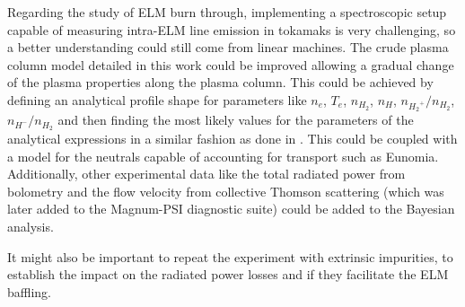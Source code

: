 Regarding the study of ELM burn through, implementing a spectroscopic setup capable of measuring intra-ELM line emission in tokamaks is very challenging, so a better understanding could still come from linear machines. The crude plasma column model detailed in this work could be improved allowing a gradual change of the plasma properties along the plasma column. This could be achieved by defining an analytical profile shape for parameters like $n_e$, $T_e$, $n_{H_2}$, $n_{H}$, $n_{{H_2}^+}/n_{H_2}$, $n_{{H}^-}/n_{H_2}$ and then finding the most likely values for the parameters of the analytical expressions in a similar fashion as done in \cite{Gahle2020}. This could be coupled with a model for the neutrals capable of accounting for transport such as Eunomia. Additionally, other experimental data like the total radiated power from bolometry and the flow velocity from collective Thomson scattering (which was later added to the Magnum-PSI diagnostic suite) could be added to the Bayesian analysis.

It might also be important to repeat the experiment with extrinsic impurities, to establish the impact on the radiated power losses and if they facilitate the ELM baffling.

